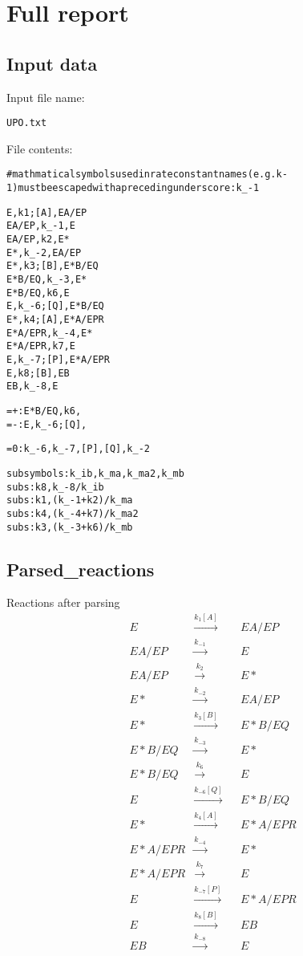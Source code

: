 \documentclass{article}%
\begin{document}
%
\normalsize%
\section{Full report}%
\label{sec:Full report}%
\subsection{Input data}%
\label{subsec:Input data}%
Input file name: %
\begin{alltt}
UPO.txt
\end{alltt}%
File contents:%
\begin{alltt}
#mathmatical symbols used in rate constant names (e.g. k-1) must be escaped with a preceding underscore: k_-1

E, k1; [A], EA/EP
EA/EP, k_-1, E
EA/EP, k2, E*
E*, k_-2, EA/EP
E*, k3; [B], E*B/EQ
E*B/EQ, k_-3, E*
E*B/EQ, k6, E
E, k_-6; [Q], E*B/EQ
E*, k4; [A], E*A/EPR
E*A/EPR, k_-4, E*
E*A/EPR, k7, E
E, k_-7; [P], E*A/EPR
E, k8; [B], EB
EB, k_-8, E

=+: E*B/EQ, k6,
=-: E, k_-6; [Q],

=0: k_-6, k_-7, [P], [Q], k_-2

subsymbols: k_ib, k_ma, k_ma2, k_mb
subs:k8, k_-8/k_ib
subs:k1, (k_-1 + k2)/k_ma
subs:k4, (k_-4+k7)/k_ma2
subs:k3, (k_-3+k6)/k_mb
\end{alltt}

%
\subsection{Parsed\_reactions}%
\label{subsec:Parsedreactions}%
Reactions after parsing \newline%
%
\begin{align*}
&E & \xrightarrow{k_{1}[A]} & &EA/EP\\
&EA/EP & \xrightarrow{k_{-1}} & &E\\
&EA/EP & \xrightarrow{k_{2}} & &E*\\
&E* & \xrightarrow{k_{-2}} & &EA/EP\\
&E* & \xrightarrow{k_{3}[B]} & &E*B/EQ\\
&E*B/EQ & \xrightarrow{k_{-3}} & &E*\\
&E*B/EQ & \xrightarrow{k_{6}} & &E\\
&E & \xrightarrow{k_{-6}[Q]} & &E*B/EQ\\
&E* & \xrightarrow{k_{4}[A]} & &E*A/EPR\\
&E*A/EPR & \xrightarrow{k_{-4}} & &E*\\
&E*A/EPR & \xrightarrow{k_{7}} & &E\\
&E & \xrightarrow{k_{-7}[P]} & &E*A/EPR\\
&E & \xrightarrow{k_{8}[B]} & &EB\\
&EB & \xrightarrow{k_{-8}} & &E\\
\end{align*}

%
\end{document}
